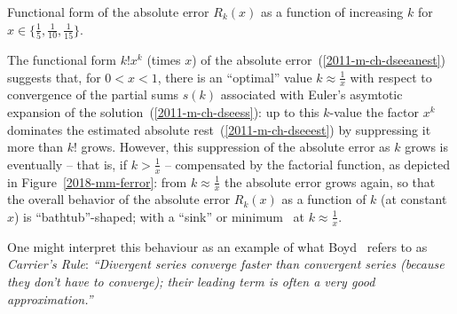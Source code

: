 \begin{marginfigure}
\begin{center}
\end{center}
\caption{Functional form of the absolute error $R_k(x)$ as a function of increasing $k$
for $x\in \{\frac{1}{5},\frac{1}{10},\frac{1}{15}\}$.}
  \label{2018-mm-ferror}
\end{marginfigure}
The functional form $k! x^k$ (times $x$) of the absolute error~(\ref{2011-m-ch-dseeanest})
suggests that, for $0<x<1$,
there is an ``optimal'' value $k \approx \frac{1}{x}$ with respect to convergence
of the partial sums $s(k)$ associated with Euler's asymtotic expansion of the solution~(\ref{2011-m-ch-dseess}):
up to this $k$-value the factor $x^k$ dominates the estimated absolute rest~(\ref{2011-m-ch-dseeest})
by suppressing it more than $k!$ grows.
However, this suppression of the absolute error as $k$ grows is eventually
-- that is, if $k > \frac{1}{x}$ -- compensated by the factorial function,
as depicted in Figure~\ref{2018-mm-ferror}: from $k \approx \frac{1}{x}$ the absolute error grows again,
so that the overall behavior of the absolute error $R_k(x)$  as a function of $k$ (at constant $x$)
is ``bathtub''-shaped; with a ``sink'' or minimum~\cite{rousseau-2004} at $k \approx \frac{1}{x}$.





One might interpret this behaviour as an example of what Boyd~\cite{Boyd99thedevil} refers to as
{\em Carrier's Rule}:
{\em ``Divergent series converge faster than convergent
series (because they don't have to converge); their
leading term is often a very good approximation.''}






\begin{center}
{\color{olive}   \Huge
 \floweroneright
}
\end{center}
